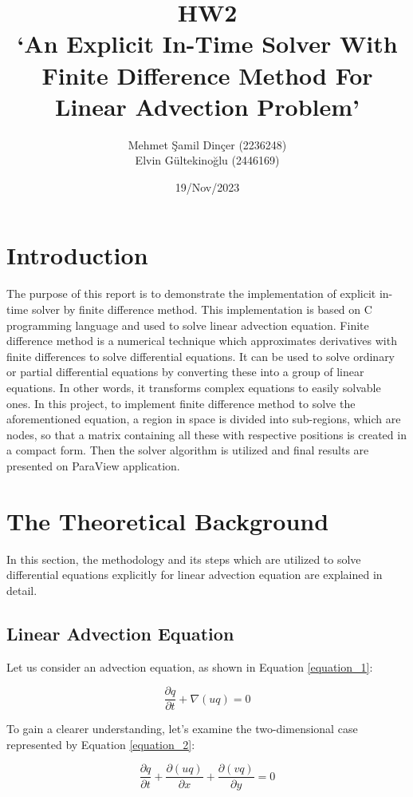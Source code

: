 \documentclass{article}
\title{HW2\\`An Explicit In-Time Solver With Finite Difference Method For Linear Advection Problem'}
\author{Mehmet Şamil Dinçer (2236248)\\
        Elvin Gültekinoğlu (2446169)}
\date{19/Nov/2023}
\begin{document}
\maketitle

\section{Introduction}
The purpose of this report is to demonstrate the implementation of explicit in-time solver by finite difference method. This implementation is based on C programming language and used to solve linear advection equation. Finite difference method is a numerical technique which approximates derivatives with finite differences to solve differential equations. It can be used to solve ordinary or partial differential equations by converting these into a group of linear equations. In other words, it transforms complex equations to easily solvable ones. In this project, to implement finite difference method to solve the aforementioned equation, a region in space is divided into sub-regions, which are nodes, so that a matrix containing all these with respective positions is created in a compact form. Then the solver algorithm is utilized and final results are presented on ParaView application. 

\clearpage
\section{The Theoretical Background}
In this section, the methodology and its steps which are utilized to solve differential equations explicitly for linear advection equation are explained in detail. 

\subsection{Linear Advection Equation}

Let us consider an advection equation, as shown in Equation \ref{equation_1}:

\begin{equation} %
    \frac{\partial q}{\partial t} + \nabla (uq) = 0 
    \label{equation_1}
\end{equation}

To gain a clearer understanding, let's examine the two-dimensional case represented by Equation \ref{equation_2}:

\begin{equation} %
    \frac{\partial q}{\partial t} + \frac{\partial (uq)}{\partial x} + \frac{\partial (vq)}{\partial y} = 0 
    \label{equation_2}
\end{equation}
\end{document}
